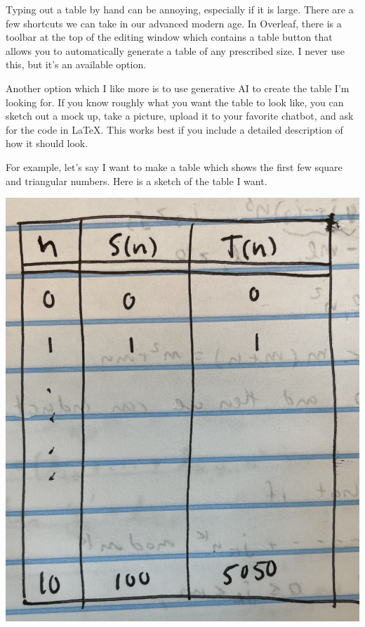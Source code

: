 \documentclass[11pt]{article}
\theoremstyle{definition}
\begin{document}
Typing out a table by hand can be annoying, especially if it is large.
There are a few shortcuts we can take in our advanced modern age. 
In Overleaf, there is a toolbar at the top of the editing window which contains a table button that allows you to automatically generate a table of any prescribed size.
I never use this, but it's an available option.

Another option which I like more is to use generative AI to create the table I'm looking for.
If you know roughly what you want the table to look like, you can sketch out a mock up, take a picture, upload it to your favorite chatbot, and ask for the code in LaTeX.
This works best if you include a detailed description of how it should look.

For example, let's say I want to make a table which shows the first few square and triangular numbers.
Here is a sketch of the table I want.
\begin{center}
    \includegraphics[scale=.06]{figs/table_sketch.jpeg}
\end{center}
\end{document}
